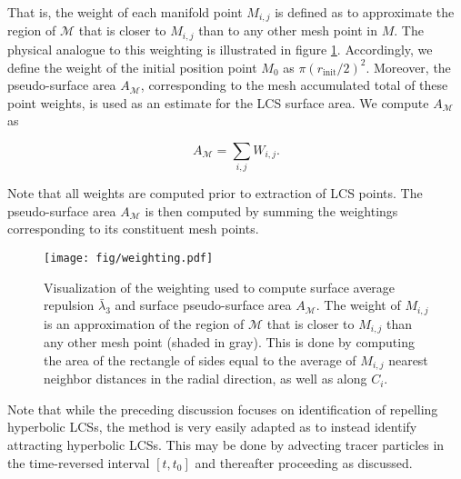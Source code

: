 \noindent That is, the weight of each manifold point $M_{i,j}$ is defined as to approximate the region of $\mathcal{M}$ that is closer to $M_{i,j}$ than to any other mesh point in $M$. The physical analogue to this weighting is illustrated in figure \ref{fig:weighting}. Accordingly, we define the weight of the initial position point $M_0$ as $\pi (r_{\text{init}}/2)^2$. Moreover, the pseudo-surface area $A_{\mathcal{M}}$, corresponding to the mesh accumulated total of these point weights, is used as an estimate for the LCS surface area. We compute $A_{\mathcal{M}}$ as

\begin{equation}\label{eq:compute_area}
A_{\mathcal{M}} = \sum_{i,j} W_{i,j}.
\end{equation} 

\noindent Note that all weights are computed prior to extraction of LCS points. The pseudo-surface area $A_{\mathcal{M}}$ is then computed by summing the weightings corresponding to its constituent mesh points.

\begin{figure}[h!] 
\centering
\texttt{[image: fig/weighting.pdf]}
\caption{Visualization of the weighting used to compute surface average repulsion $\bar{\lambda}_3$ and surface pseudo-surface area $A_{\mathcal{M}}$. The weight of $M_{i,j}$ is an approximation of the region of $\mathcal{M}$ that is closer to $M_{i,j}$ than any other mesh point (shaded in gray). This is done by computing the area of the rectangle of sides equal to the average of $M_{i,j}$ nearest neighbor distances in the radial direction, as well as along $C_i$.}\label{fig:weighting}
\end{figure}

Note that while the preceding discussion focuses on identification of repelling hyperbolic LCSs, the method is very easily adapted as to instead identify attracting hyperbolic LCSs. This may be done by advecting tracer particles in the time-reversed interval $[t,t_0]$ and thereafter proceeding as discussed.



